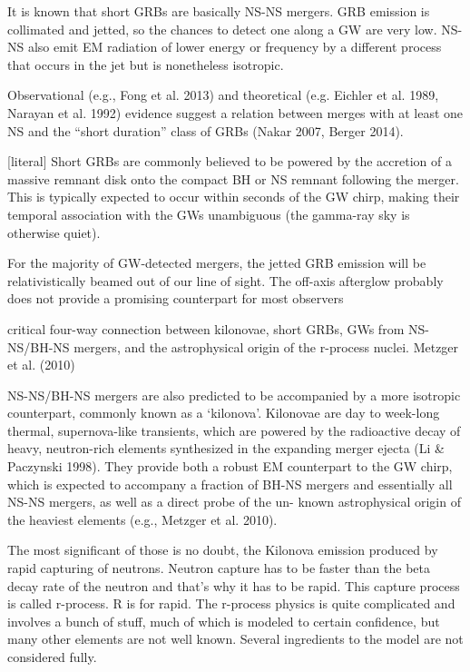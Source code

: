 It is known that short GRBs are basically NS-NS mergers.
GRB emission is collimated and jetted, so the chances to detect one along a GW are very low.
NS-NS also emit EM radiation of lower energy or frequency by a different process that occurs in the jet but is nonetheless isotropic. 

Observational (e.g., Fong et al. 2013) and theoretical (e.g. Eichler et al. 1989, Narayan et al. 1992) evidence suggest a relation between merges with at least one NS and the ``short duration'' class of GRBs (Nakar 2007, Berger 2014). 


[literal] Short GRBs are commonly believed to be powered by the accretion of a massive remnant disk onto the compact BH or NS remnant following the merger. This is typically expected to occur within seconds of the GW chirp, making their temporal association with the GWs unambiguous (the gamma-ray sky is otherwise quiet).

For the majority of GW-detected mergers, the jetted GRB emission will be relativistically beamed out of our line of sight.
The off-axis afterglow probably does not provide a promising counterpart for most observers

critical four-way connection between kilonovae, short GRBs, GWs from NS-NS/BH-NS mergers, and the astrophysical origin of the r-process nuclei. Metzger et al. (2010)

NS-NS/BH-NS mergers are also predicted to be accompanied by a more isotropic counterpart, commonly known as a `kilonova'. Kilonovae are day to week-long thermal, supernova-like transients, which are powered by the radioactive decay of heavy, neutron-rich elements synthesized in the expanding merger ejecta (Li \& Paczynski 1998). They provide both a robust EM counterpart to the GW chirp, which is expected to accompany a fraction of BH-NS mergers and essentially all NS-NS mergers, as well as a direct probe of the un- known astrophysical origin of the heaviest elements (e.g., Metzger et al. 2010).

The most significant of those is no doubt, the Kilonova emission produced by rapid capturing of neutrons.
Neutron capture has to be faster than the beta decay rate of the neutron and that's why it has to be rapid.
This capture process is called r-process. R is for rapid.
The r-process physics is quite complicated and involves a bunch of stuff, much of which is modeled to certain confidence, but many other elements are not well known. Several ingredients to the model are not considered fully. 

